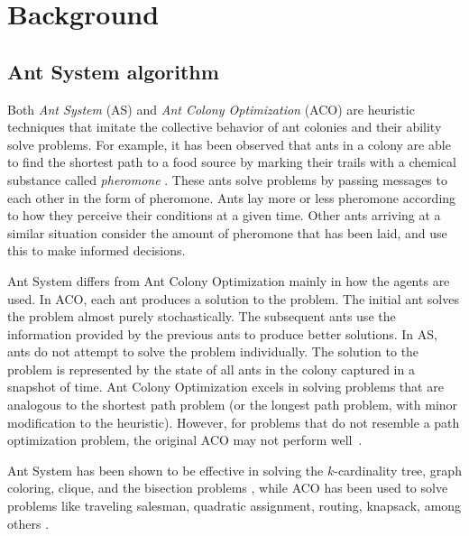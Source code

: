 \documentclass[11pt]{article}
\begin{document}

\section{Background}\label{background} 

\subsection{Ant System algorithm}\label{max_clique} 

Both \textit{Ant System} (AS) and \textit{Ant Colony Optimization} (ACO) are heuristic techniques that imitate the collective behavior of ant colonies and their ability solve problems.  For example, it has been observed that ants in a colony are able to find the shortest path to a food source by marking their trails with a chemical substance called {\it pheromone} \cite{BDT}\cite{DG}.  These ants solve problems by passing messages to each other in the form of pheromone. Ants lay more or less pheromone according to how they perceive their conditions at a given time. Other ants arriving at a similar situation consider the amount of pheromone that has been laid, and use this to make informed decisions. 


Ant System differs from Ant Colony Optimization mainly in how the agents are used. In ACO, each ant produces a solution to the problem. The initial ant solves the problem almost purely stochastically. The subsequent ants use the information provided by the previous ants to produce better solutions. In AS, ants do not attempt to solve the problem individually. The solution to the problem is represented by the state of all ants in the colony captured in a snapshot of time.  Ant Colony Optimization excels in solving problems that are analogous to the shortest path problem (or the longest path problem, with minor modification to the heuristic). However, for problems that do not resemble a path optimization problem, the original ACO may not perform well~\cite{todo}.

Ant System has been shown to be effective in solving the $k$-cardinality tree, graph coloring, clique, and the bisection problems \cite{BS1}, while ACO has been used to solve problems like traveling salesman, quadratic assignment, routing, knapsack, among others \cite{BJ2, MC}.


\end{document}
